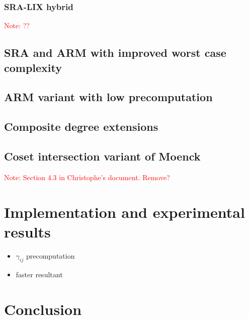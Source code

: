 \documentclass{article}
\newcommand{\Notes}[1]{\textcolor{red}{Note: #1}}
\begin{document}
\subsubsection{SRA-LIX hybrid}
\Notes{??}



\subsection{SRA and ARM with improved worst case complexity}
\label{sec:worst-case}


\subsection{ARM variant with low precomputation}
\label{sec:low-precomputation}


\subsection{Composite degree extensions}
\label{sec:composite-degree}


\subsection{Coset intersection variant of Moenck}
\label{sec:SRAMoenck}
\Notes{Section 4.3 in Christophe's document. Remove?}



\section{Implementation and experimental results}
\label{sec:impl-exper-results}

\begin{itemize}
\item $\gamma_{ij}$ precomputation
\item faster resultant
\end{itemize}

\section{Conclusion}
\label{sec:conclusion}





\end{document}
